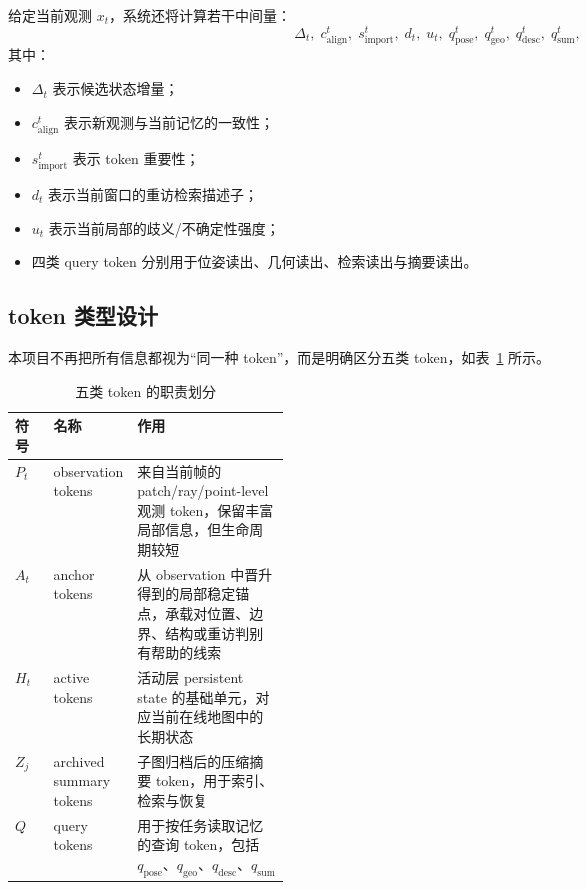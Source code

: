 \documentclass[12pt]{article}
\begin{document}
给定当前观测 $x_t$，系统还将计算若干中间量：
\begin{equation}
\Delta_t,\; c_{\text{align}}^t,\; s_{\text{import}}^t,\; d_t,\; u_t,\; q_{\text{pose}}^t,\; q_{\text{geo}}^t,\; q_{\text{desc}}^t,\; q_{\text{sum}}^t,
\end{equation}
其中：
\begin{itemize}
  \item $\Delta_t$ 表示候选状态增量；
  \item $c_{\text{align}}^t$ 表示新观测与当前记忆的一致性；
  \item $s_{\text{import}}^t$ 表示 token 重要性；
  \item $d_t$ 表示当前窗口的重访检索描述子；
  \item $u_t$ 表示当前局部的歧义/不确定性强度；
  \item 四类 query token 分别用于位姿读出、几何读出、检索读出与摘要读出。
\end{itemize}

\subsection{token 类型设计}

本项目不再把所有信息都视为“同一种 token”，而是明确区分五类 token，如表~\ref{tab:token-types} 所示。

\begin{table}[H]
\centering
\caption{五类 token 的职责划分}
\label{tab:token-types}
\begin{tabularx}{\linewidth}{>{\raggedright\arraybackslash}p{0.14\linewidth} >{\raggedright\arraybackslash}p{0.18\linewidth} X}
\toprule
符号 & 名称 & 作用 \\
\midrule
$P_t$ & observation tokens & 来自当前帧的 patch/ray/point-level 观测 token，保留丰富局部信息，但生命周期较短 \\
$A_t$ & anchor tokens & 从 observation 中晋升得到的局部稳定锚点，承载对位置、边界、结构或重访判别有帮助的线索 \\
$H_t$ & active tokens & 活动层 persistent state 的基础单元，对应当前在线地图中的长期状态 \\
$Z_j$ & archived summary tokens & 子图归档后的压缩摘要 token，用于索引、检索与恢复 \\
$Q$ & query tokens & 用于按任务读取记忆的查询 token，包括 $q_{\text{pose}}$、$q_{\text{geo}}$、$q_{\text{desc}}$、$q_{\text{sum}}$ \\
\bottomrule
\end{tabularx}
\end{table}
\end{document}
